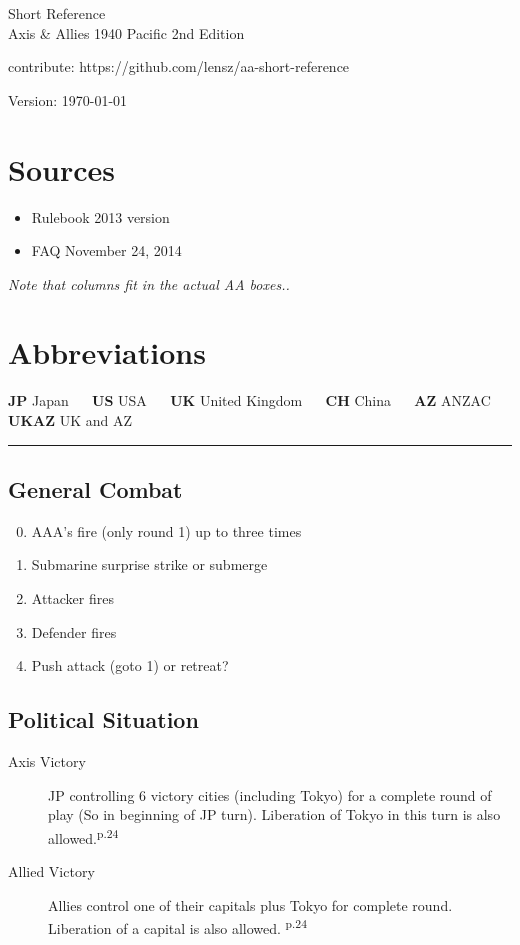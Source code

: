 \documentclass[10pt,twoside]{article}
\begin{document}
\begin{multicols*}{3}
\begin{center}
{\Large Short Reference}\\
\vspace{.2cm}
{\large Axis \& Allies 1940 Pacific 2nd Edition}

\vspace{.5cm}
contribute: https://github.com/lensz/aa-short-reference

\vspace{.5cm}
Version: \today
\end{center}

\section*{{\normalsize Sources}}
\begin{itemize}
\item Rulebook 2013 version
\item FAQ November 24, 2014
\end{itemize}

\noindent\textsl{Note that columns fit in the actual AA boxes..}

\section*{{\normalsize Abbreviations}}
\textbf{JP} Japan ~~ \textbf{US} USA ~~ \textbf{UK} United Kingdom ~~ \textbf{CH} China ~~ \textbf{AZ} ANZAC ~~ \textbf{UKAZ} UK and AZ

\begin{center}
\rule{6.5cm}{0.4pt}
\end{center}


\subsection*{General Combat}
\begin{enumerate}
\setcounter{enumi}{-1}
\item AAA's fire (only round 1) up to three times
\item Submarine surprise strike or submerge
\item Attacker fires
\item Defender fires
\item Push attack (goto 1) or retreat?
\end{enumerate}

\subsection*{Political Situation}
\begin{description}
\item[Axis Victory] JP controlling 6 victory cities (including Tokyo) for a complete round of play (So in beginning of JP turn). Liberation of Tokyo in this turn is also allowed.\textsuperscript{p.24}
\item[Allied Victory] Allies control one of their capitals plus Tokyo for complete round. Liberation  of a capital is also allowed. \textsuperscript{p.24}
\end{description}


\end{multicols*}
\end{document}
